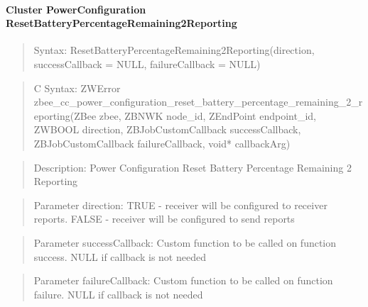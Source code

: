 \paragraph{Cluster PowerConfiguration ResetBatteryPercentageRemaining2Reporting}
\begin{quote}Syntax: ResetBatteryPercentageRemaining2Reporting(direction, successCallback = NULL, failureCallback = NULL)\end{quote}
\begin{quote}C Syntax: ZWError zbee\_cc\_power\_configuration\_reset\_battery\_percentage\_remaining\_2\_reporting(ZBee zbee, ZBNWK node\_id, ZEndPoint endpoint\_id, ZWBOOL direction, ZBJobCustomCallback successCallback, ZBJobCustomCallback failureCallback, void* callbackArg)\end{quote}
\begin{quote}Description: Power Configuration Reset Battery Percentage Remaining 2 Reporting\end{quote}
\begin{quote}Parameter direction: TRUE  - receiver will be configured to receiver reports. FALSE - receiver will be configured to send reports\end{quote}
\begin{quote}Parameter successCallback: Custom function to be called on function success. NULL if callback is not needed\end{quote}
\begin{quote}Parameter failureCallback: Custom function to be called on function failure. NULL if callback is not needed\end{quote}


